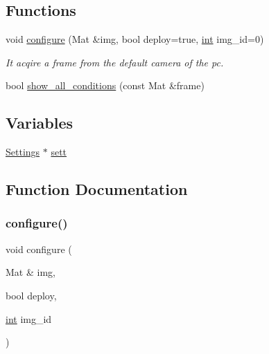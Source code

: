 \subsection*{Functions}
\begin{DoxyCompactItemize}
\item 
void \mbox{\hyperlink{configure_8hh_a4af3a6cc6d91b8adc318da223264aa2f}{configure}} (Mat \&img, bool deploy=true, \mbox{\hyperlink{draw_8hh_aa620a13339ac3a1177c86edc549fda9b}{int}} img\+\_\+id=0)
\begin{DoxyCompactList}\small\item\em It acqire a frame from the default camera of the pc. \end{DoxyCompactList}\item 
bool \mbox{\hyperlink{configure_8hh_a7a820e1422cbd41bba0662593fed05d8}{show\+\_\+all\+\_\+conditions}} (const Mat \&frame)
\end{DoxyCompactItemize}
\subsection*{Variables}
\begin{DoxyCompactItemize}
\item 
\mbox{\hyperlink{class_settings}{Settings}} $\ast$ \mbox{\hyperlink{configure_8hh_a4f37177ee03b8ce3859a16bb3d82f189}{sett}}
\end{DoxyCompactItemize}


\subsection{Function Documentation}
\mbox{\label{configure_8hh_a4af3a6cc6d91b8adc318da223264aa2f}} 
\subsubsection{\texorpdfstring{configure()}{configure()}}
{\footnotesize\ttfamily void configure (\begin{DoxyParamCaption}\item[{Mat \&}]{img,  }\item[{bool}]{deploy,  }\item[{\mbox{\hyperlink{draw_8hh_aa620a13339ac3a1177c86edc549fda9b}{int}}}]{img\+\_\+id }\end{DoxyParamCaption})}



